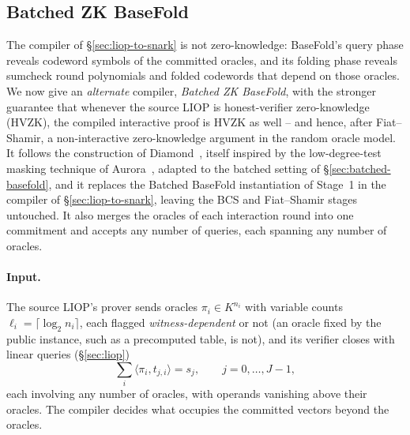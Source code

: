 \documentclass{article}
\theoremstyle{definition}
\begin{document}
\subsection{Batched ZK BaseFold}
\label{sec:batched-zk-basefold}

The compiler of \S\ref{sec:liop-to-snark} is not zero-knowledge: BaseFold's query phase reveals codeword symbols of the committed oracles, and its folding phase reveals sumcheck round polynomials and folded codewords that depend on those oracles. We now give an \emph{alternate} compiler, \emph{Batched ZK BaseFold}, with the stronger guarantee that whenever the source LIOP is honest-verifier zero-knowledge (HVZK), the compiled interactive proof is HVZK as well -- and hence, after Fiat--Shamir, a non-interactive zero-knowledge argument in the random oracle model. It follows the construction of Diamond~\cite{Diamond:2025ac}, itself inspired by the low-degree-test masking technique of Aurora~\cite{Ben-Sasson:2019ab}, adapted to the batched setting of \S\ref{sec:batched-basefold}, and it replaces the Batched BaseFold instantiation of Stage~1 in the compiler of \S\ref{sec:liop-to-snark}, leaving the BCS and Fiat--Shamir stages untouched. It also merges the oracles of each interaction round into one commitment and accepts any number of queries, each spanning any number of oracles.

\paragraph{Input.}
The source LIOP's prover sends oracles $\pi_i \in K^{n_i}$ with variable counts $\ell_i = \lceil \log_2 n_i \rceil$, each flagged \emph{witness-dependent} or not (an oracle fixed by the public instance, such as a precomputed table, is not), and its verifier closes with linear queries (\S\ref{sec:liop})
\[
  \sum_i \langle \pi_i, t_{j, i} \rangle = s_j, \qquad j = 0, \ldots, J - 1,
\]
each involving any number of oracles, with operands vanishing above their oracles. The compiler decides what occupies the committed vectors beyond the oracles.
\end{document}
